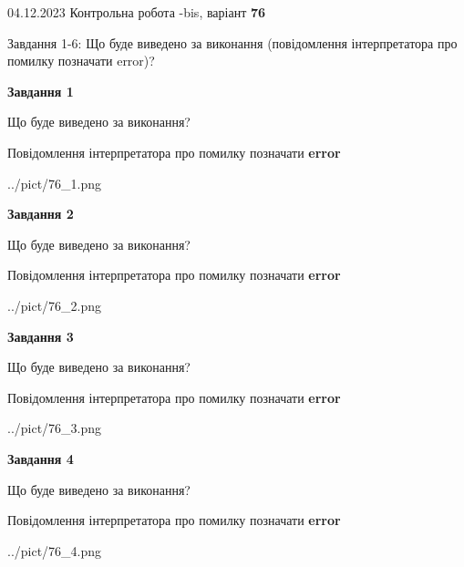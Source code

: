 \documentclass[12pt, ukrainian]{article}
\begin{document}
{{04.12.2023 Контрольна робота -bis, варіант  \No \textbf { 76 }\par}}
{

Завдання 1-6: Що буде виведено за виконання (повідомлення інтерпретатора про помилку позначати error)?


{\begin {center}\textbf{Завдання 1}\end {center}}\par
Що буде виведено за виконання? \par
Повідомлення інтерпретатора про помилку позначати \textbf{error}

\begin{center}
	{../pict/76_1.png}
\end{center}
\newpage

{\begin {center}\textbf{Завдання 2}\end {center}}\par
Що буде виведено за виконання? \par
Повідомлення інтерпретатора про помилку позначати \textbf{error}

\begin{center}
	{../pict/76_2.png}
\end{center}
\newpage

{\begin {center}\textbf{Завдання 3}\end {center}}\par
Що буде виведено за виконання? \par
Повідомлення інтерпретатора про помилку позначати \textbf{error}

\begin{center}
	{../pict/76_3.png}
\end{center}
\newpage

{\begin {center}\textbf{Завдання 4}\end {center}}\par
Що буде виведено за виконання? \par
Повідомлення інтерпретатора про помилку позначати \textbf{error}

\begin{center}
	{../pict/76_4.png}
\end{center}
\newpage

}
\end{document}
